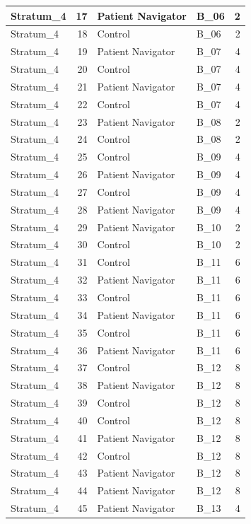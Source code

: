 \documentclass[
]{book}
\begin{document}
\begin{table}[H]
\begin{tabular}{l|r|l|l|r}
\hline
Stratum\_4 & 17 & Patient Navigator & B\_06 & 2\\
\hline
Stratum\_4 & 18 & Control & B\_06 & 2\\
\hline
Stratum\_4 & 19 & Patient Navigator & B\_07 & 4\\
\hline
Stratum\_4 & 20 & Control & B\_07 & 4\\
\hline
Stratum\_4 & 21 & Patient Navigator & B\_07 & 4\\
\hline
Stratum\_4 & 22 & Control & B\_07 & 4\\
\hline
Stratum\_4 & 23 & Patient Navigator & B\_08 & 2\\
\hline
Stratum\_4 & 24 & Control & B\_08 & 2\\
\hline
Stratum\_4 & 25 & Control & B\_09 & 4\\
\hline
Stratum\_4 & 26 & Patient Navigator & B\_09 & 4\\
\hline
Stratum\_4 & 27 & Control & B\_09 & 4\\
\hline
Stratum\_4 & 28 & Patient Navigator & B\_09 & 4\\
\hline
Stratum\_4 & 29 & Patient Navigator & B\_10 & 2\\
\hline
Stratum\_4 & 30 & Control & B\_10 & 2\\
\hline
Stratum\_4 & 31 & Control & B\_11 & 6\\
\hline
Stratum\_4 & 32 & Patient Navigator & B\_11 & 6\\
\hline
Stratum\_4 & 33 & Control & B\_11 & 6\\
\hline
Stratum\_4 & 34 & Patient Navigator & B\_11 & 6\\
\hline
Stratum\_4 & 35 & Control & B\_11 & 6\\
\hline
Stratum\_4 & 36 & Patient Navigator & B\_11 & 6\\
\hline
Stratum\_4 & 37 & Control & B\_12 & 8\\
\hline
Stratum\_4 & 38 & Patient Navigator & B\_12 & 8\\
\hline
Stratum\_4 & 39 & Control & B\_12 & 8\\
\hline
Stratum\_4 & 40 & Control & B\_12 & 8\\
\hline
Stratum\_4 & 41 & Patient Navigator & B\_12 & 8\\
\hline
Stratum\_4 & 42 & Control & B\_12 & 8\\
\hline
Stratum\_4 & 43 & Patient Navigator & B\_12 & 8\\
\hline
Stratum\_4 & 44 & Patient Navigator & B\_12 & 8\\
\hline
Stratum\_4 & 45 & Patient Navigator & B\_13 & 4\\

\end{tabular}
\end{table}
\end{document}
